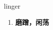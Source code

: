 
\begin{frame}
{\huge linger}
\begin{center}
\begin{enumerate}\Large
  \item \textbf{磨蹭，闲荡}
\end{enumerate}
\end{center}
\end{frame}
